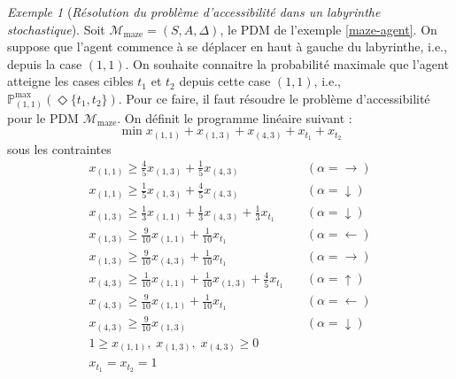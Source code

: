 \documentclass[12pt,a4paper]{report}
\theoremstyle{definition}%
\theoremstyle{remark}
\newtheorem{example}{Exemple}[chapter]
\newcommand{\pr}{\mathbb{P}}
\begin{document}
\begin{example}[\textit{Résolution du problème d'accessibilité dans un labyrinthe stochastique}]
	Soit $\mathcal{M}_{\text{maze}} = (S, A, \Delta)$, le PDM de l'exemple
	\ref{maze-agent}. On suppose que l'agent commence à se déplacer en haut à
	gauche du labyrinthe, i.e., depuis la case $(1, 1)$. On souhaite
	connaitre la probabilité maximale que l'agent atteigne les cases cibles $t_1$
	et $t_2$ depuis cette case $(1, 1)$, i.e.,
	$\pr^{\max}_{(1, 1)}(\Diamond \{t_1, t_2\})$. Pour ce faire, il faut résoudre
	le problème d'accessibilité pour le PDM $\mathcal{M}_{\text{maze}}$.
	On définit le programme linéaire suivant :
	\[
		\min x_{(1, 1)} + x_{(1, 3)} + x_{(4, 3)} + x_{t_1} + x_{t_2}
	\]
	sous les contraintes \\
 	\begin{equation*}
  \renewcommand{\arraystretch}{1.3}
  \begin{array}{ll}
		x_{(1, 1)} \geq \frac{4}{5} x_{(1, 3)} + \frac{1}{5} x_{(4, 3)}
			\quad & (\alpha = \rightarrow) \\
		x_{(1, 1)} \geq \frac{1}{5} x_{(1, 3)} + \frac{4}{5} x_{(4, 3)}
			\quad & (\alpha = \downarrow) \\
		x_{(1, 3)} \geq \frac{1}{3} x_{(1, 1)} + \frac{1}{3} x_{(4, 3)} + \frac{1}{3} x_{t_1}
			\quad & (\alpha = \downarrow) \\
		x_{(1, 3)} \geq \frac{9}{10} x_{(1, 1)} + \frac{1}{10}x_{t_1}
			\quad & (\alpha = \leftarrow) \\
		x_{(1, 3)} \geq \frac{9}{10} x_{(4, 3)} + \frac{1}{10}x_{t_1}
			\quad & (\alpha = \rightarrow)\\
		x_{(4, 3)} \geq \frac{1}{10} x_{(1, 1)} + \frac{1}{10} x_{(1, 3)} + \frac{4}{5}x_{t_1}
			\quad & (\alpha = \uparrow)\\
		x_{(4, 3)} \geq \frac{9}{10} x_{(1, 1)} + \frac{1}{10}x_{t_1}
			\quad & (\alpha = \leftarrow)\\
		x_{(4, 3)} \geq \frac{9}{10} x_{(1, 3)}
			\quad & (\alpha = \downarrow) \\
		1 \geq x_{(1, 1)}, \; x_{(1, 3)}, \; x_{(4, 3)} \geq 0 \\
		x_{t_1} = x_{t_2} = 1
	\end{array}
 	\end{equation*}


\end{example}
\end{document}
